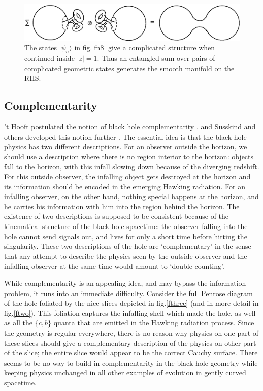 \documentclass[12pt]{article}
\begin{document}
\begin{figure}[htbp]
\begin{center}
\includegraphics[scale=.75]{fn9.eps}
\caption{{The states $|\psi_n\rangle$ in fig.\ref{fn8} give a complicated structure when continued inside $|z|=1$.  Thus an entangled sum over pairs of complicated geometric states generates the smooth manifold on the RHS.}}
\label{fn9}
\end{center}
\end{figure}

\subsection{Complementarity}

't Hooft postulated the notion of black hole complementarity \cite{thooft1}, and Susskind and others developed this notion further \cite{suss1}. The essential idea is that the black hole physics has two different descriptions. For an observer outside the horizon, we should use a description where there is no region interior to the horizon: objects fall to the horizon, with this infall slowing down because of the diverging redshift. For this outside observer, the infalling object gets destroyed at the horizon and its information should be encoded in the emerging Hawking radiation. For an infalling observer, on the other hand, nothing special happens at the horizon, and he carries his information with him into the region behind the horizon. The existence of two descriptions is supposed to be consistent because of the kinematical structure of the black hole spacetime: the observer falling into the hole cannot send signals out, and lives for only a short time before hitting the singularity. These two descriptions of the hole are `complementary' in the sense that any attempt to describe the physics seen by the outside observer and the infalling observer at the same time would amount to `double counting'. 

While complementarity is an appealing idea, and may bypass the information problem, it runs into an immediate difficulty. Consider the full Penrose diagram of the hole foliated by the nice slices depicted in fig.\ref{fthree} (and in more detail in fig.\ref{ftwo}). This foliation captures 
the infalling shell which made the hole, as well as all the $\{c, b\}$ quanta that are emitted in the Hawking radiation process. Since the geometry is regular everywhere, there is no reason why physics on one part of these slices should give a complementary description of the physics on other part of the slice; the entire slice would appear to be the correct Cauchy surface. There seems to be no way to build in complementarity in the black hole geometry while keeping physics unchanged in all other examples of evolution in gently curved spacetime.
\end{document}
